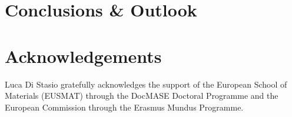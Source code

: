 \documentclass[review]{elsarticle}
\begin{document}

\section{Conclusions \& Outlook}


\section*{Acknowledgements}

Luca Di Stasio gratefully acknowledges the support of the European School of Materials (EUSMAT) through the DocMASE Doctoral Programme and the European Commission through the Erasmus Mundus Programme.



\end{document}
